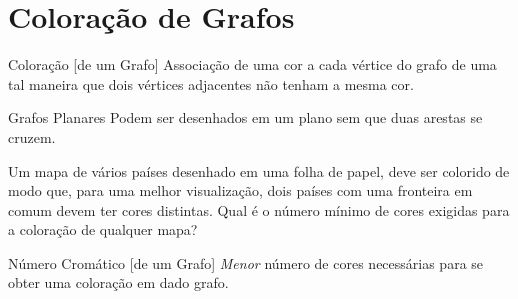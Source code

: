 
\section{Coloração de Grafos}
\newcommand{\drawFilledNode}[4][1-]{%
	\node<#1>[circle,draw,fill,#2] at (#3) {\textcolor{black}{#4}};
}%

\begin{frame}[label=notas]
	\begin{block}{Coloração [de um Grafo]}
		Associação de uma cor a cada vértice do grafo de uma tal maneira que 
		dois vértices adjacentes não tenham a mesma cor.
	\end{block}
	\vfill\pause
	\begin{exampleblock}{Grafos Planares}
		Podem ser desenhados em um plano sem que duas arestas se cruzem.
	\end{exampleblock}
\end{frame}

\begin{frame}[label=notas]
	Um mapa de vários países desenhado em uma folha de papel, deve ser colorido 
	de modo que, para uma melhor visualização, dois países com uma fronteira em 
	comum devem ter cores distintas.  Qual é o número mínimo de cores exigidas 
	para a coloração de qualquer mapa?
	\\\vfill\pause
	\vfill\pause
	\begin{block}{Número Cromático [de um Grafo]}
		\emph{Menor} número de cores necessárias para se obter uma coloração em 
		dado grafo.
	\end{block}
\end{frame}

